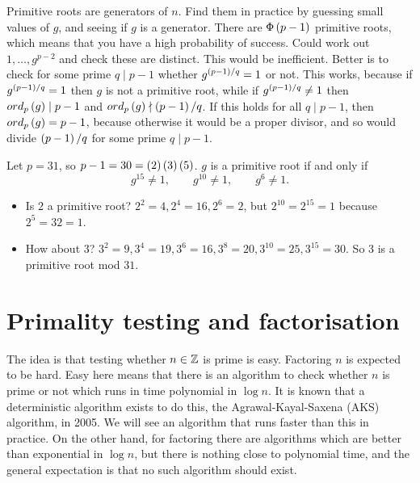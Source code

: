 
Primitive roots are generators of $ \unit{n} $. Find them in practice by guessing small values of $ g $, and seeing if $ g $ is a generator. There are $ \Phi\br{p - 1} $ primitive roots, which means that you have a high probability of success. Could work out $ 1, \dots, g^{p - 2} $ and check these are distinct. This would be inefficient. Better is to check for some prime $ q \mid p - 1 $ whether $ g^{\br{p - 1} / q} = 1 $ or not. This works, because if $ g^{\br{p - 1} / q} = 1 $ then $ g $ is not a primitive root, while if $ g^{\br{p - 1} / q} \ne 1 $ then $ ord_p\br{g} \mid p - 1 $ and $ ord_p\br{g} \nmid \br{p - 1} / q $. If this holds for all $ q \mid p - 1 $, then $ ord_p\br{g} = p - 1 $, because otherwise it would be a proper divisor, and so would divide $ \br{p - 1} / q $ for some prime $ q \mid p - 1 $.

\begin{example*}
Let $ p = 31 $, so $ p - 1 = 30 = \br{2}\br{3}\br{5} $. $ g $ is a primitive root if and only if
$$ g^{15} \ne 1, \qquad g^{10} \ne 1, \qquad g^{6} \ne 1. $$
\begin{itemize}
\item Is $ 2 $ a primitive root? $ 2^2 = 4, 2^4 = 16, 2^6 = 2 $, but $ 2^{10} = 2^{15} = 1 $ because $ 2^5 = 32 = 1 $.
\item How about $ 3 $? $ 3^2 = 9, 3^4 = 19, 3^6 = 16, 3^8 = 20, 3^{10} = 25, 3^{15} = 30 $. So $ 3 $ is a primitive root mod $ 31 $.
\end{itemize}
\end{example*}

\pagebreak

\section{Primality testing and factorisation}

The idea is that testing whether $ n \in \mathbb{Z} $ is prime is easy. Factoring $ n $ is expected to be hard. Easy here means that there is an algorithm to check whether $ n $ is prime or not which runs in time polynomial in $ \log n $. It is known that a deterministic algorithm exists to do this, the Agrawal-Kayal-Saxena (AKS) algorithm, in 2005. We will see an algorithm that runs faster than this in practice. On the other hand, for factoring there are algorithms which are better than exponential in $ \log n $, but there is nothing close to polynomial time, and the general expectation is that no such algorithm should exist.

